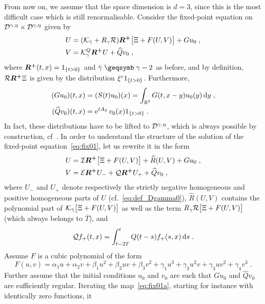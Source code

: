 \documentclass[reqno,11pt]{article}
\def\Rplus{\boldsymbol{R^+}}
\def\Tbar{\overline T}
\begin{document}
From now on, we assume that the space dimension is $d=3$, since this is the
most difficult case which is still renormalisable. 
Consider the fixed-point equation on ${\mathcal D}^{\gamma,\eta}\times{\mathcal D}^{\gamma,\eta}$
given by 
\begin{align}
\nonumber
U &= (\cK_{\bar\gamma}+R_\gamma\cR)\Rplus \bigbrak{\Xi+F(U,V)} + Gu_0\;, \\
V &= \cK^Q_\gamma\Rplus U + \widehat Qv_0\;, 
\label{eq:fix01} 
\end{align}
where $\Rplus(t,x)=\indexfct{t>0}$ and $\bar\gamma\geqs\gamma-2$ as before, 
and by definition, $\cR\Rplus\Xi$ is given by the distribution $\xi^\varepsilon1_{\{t>0\}}$.
Furthermore, 
\begin{align}
\nonumber
(Gu_0)(t,x) &= (S(t)u_0)(x) = \int_{\R^3} G(t,x-y)u_0(y)\6y\;, \\
(\widehat Qv_0)(t,x) &= \e^{tA_2}v_0(x) \indexfct{t>0}\;.
\label{ew:fix01b} 
\end{align}
In fact, these distributions have to be lifted to ${\mathcal D}^{\gamma,\eta}$, which is
always possible by construction, cf~\cite[Def.~2.14]{Hairer2014}. In order to 
understand the structure of the solution of the
fixed-point equation~\eqref{eq:fix01}, let us rewrite it in the form 
\begin{align}
\nonumber
U &= \cI\Rplus \bigbrak{\Xi+F(U,V)} + \widehat R(U,V) + Gu_0\;, \\
V &= \cE\Rplus U_- + \cQ \Rplus U_+ + \widehat Qv_0\;, 
\label{eq:fix01a} 
\end{align}
where $U_-$ and $U_+$ denote respectively the strictly negative homogeneous
and positive homogeneous parts of $U$ (cf.~\eqref{eq:def_Dgamma0}),
$\widehat R(U,V)$ contains the polynomial part of
${\mathcal K}_{\bar\gamma}\bigl[\Xi+F(U,V)\bigr]$ as well as the term
$R_\gamma{\mathcal R}\bigl[\Xi+F(U,V)\bigr]$ (which always belongs to $\Tbar$), and
\begin{equation}
 \label{eq:def_cQ}
 \cQ f_+(t,x) = \int_{t-2T}^t Q(t-s)f_+(s,x)\6s\;.
\end{equation} 
Assume $F$ is a cubic polynomial of the form 
\begin{equation}
 \label{eq:fix02}
  F(u,v) = \alpha_1 u + \alpha_2 v + \beta_1 u^2 + \beta_2 uv + \beta_3 v^2
 + \gamma_1 u^3 + \gamma_2 u^2v + \gamma_3 uv^2 + \gamma_4 v^3\;.
\end{equation}
Further assume that the initial conditions $u_0$ and $v_0$ are such that $Gu_0$
and $\widehat Qv_0$ are sufficiently regular. Iterating the
map~\eqref{eq:fix01a}, starting for instance with identically zero functions, it
\end{document}
